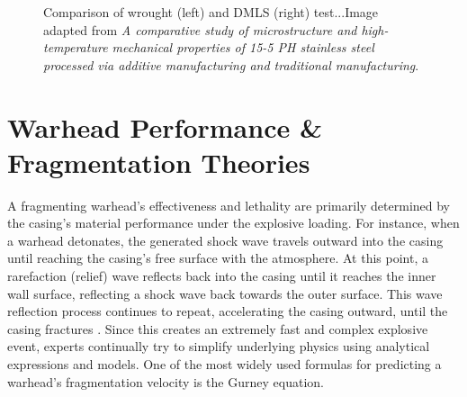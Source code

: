 \begin{figure}[H]
	\centering
    \caption{Comparison of wrought (left) and DMLS (right) test...Image adapted from \textit{A comparative study of microstructure and high-temperature mechanical properties of 15-5 PH stainless steel processed via additive manufacturing and traditional manufacturing}\cite{Roberts_Traditional_AM_15_5_testing}.} 
    \label{fig:2_Wrought_vs_DMLS_fracture surface}
\end{figure}
%



\section{Warhead Performance \& Fragmentation Theories} \label{sec:2_Warhead_Fragmentation_Theories}

A fragmenting warhead's effectiveness and lethality are primarily determined by the casing's material performance under the explosive loading. For instance, when a warhead detonates, the generated shock wave travels outward into the casing until reaching the casing's free surface with the atmosphere. At this point, a rarefaction (relief) wave reflects back into the casing until it reaches the inner wall surface, reflecting a shock wave back towards the outer surface. This wave reflection process continues to repeat, accelerating the casing outward, until the casing fractures \cite{Blast_injury_science_shockwave}. Since this creates an extremely fast and complex explosive event, experts continually try to simplify underlying physics using analytical expressions and models. One of the most widely used formulas for predicting a warhead's fragmentation velocity is the Gurney equation.  


